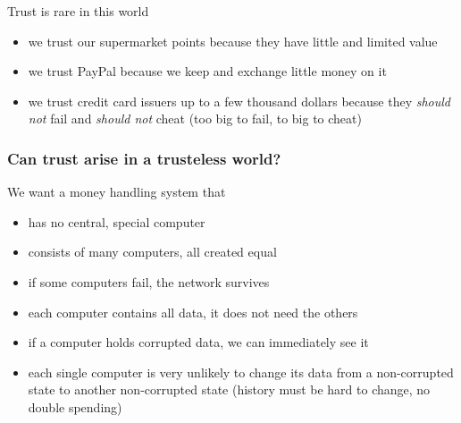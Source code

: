 \documentclass[11pt]{beamer}  %
\begin{document}
\begin{frame}{Trust is rare in this world}

  \begin{itemize}
  \item we trust our supermarket points because they have little and limited value
  \item we trust PayPal because we keep and exchange little money on it
  \item we trust credit card issuers up to a few thousand dollars
    because they \emph{should not} fail
    and \emph{should not} cheat (too big to fail, to big to cheat)
  \end{itemize}

\end{frame}

\begin{frame}\frametitle{Can trust arise in a trusteless world?}

  \begin{greenbox}{We want a money handling system that}
    \begin{itemize}
    \item has no central, special computer
    \item consists of many computers, all created equal
    \item if some computers fail, the network survives
    \item each computer contains all data, it does not need the others
    \item if a computer holds corrupted data, we can immediately see it
    \item each single computer is very unlikely to change its data
      from a non-corrupted state to another non-corrupted state (history
      must be hard to change, no double spending)
    \end{itemize}
  \end{greenbox}


\end{frame}
\end{document}
